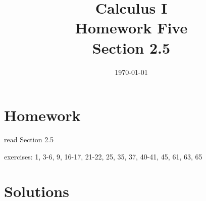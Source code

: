 \documentclass[letterpaper]{exam}
\title{Calculus I \\ Homework Five \\ Section 2.5}
\author{}
\date{\today}
\begin{document}
  \maketitle

  \section{Homework}
    \begin{itemize*}
      \item read Section 2.5
      \item exercises: 1, 3-6, 9, 16-17, 21-22, 25, 35, 37, 40-41, 45, 61, 63, 65
    \end{itemize*}

  \ifprintanswers

  \section{Solutions}
\end{document}
